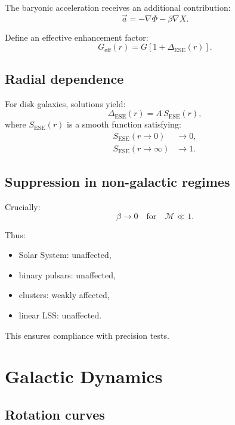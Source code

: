 \documentclass[11pt]{book}
\newcommand{\ESE}{\mathrm{ESE}}
\begin{document}
The baryonic acceleration receives an additional contribution:
\begin{equation}
\vec{a}
=
-\nabla \Phi
-
\beta \nabla X.
\end{equation}

Define an effective enhancement factor:
\begin{equation}
G_{\mathrm{eff}}(r)
=
G\left[1 + \Delta_{\ESE}(r)\right].
\end{equation}

\section{Radial dependence}

For disk galaxies, solutions yield:
\begin{equation}
\Delta_{\ESE}(r)
=
A\,S_{\ESE}(r),
\end{equation}
where $S_{\ESE}(r)$ is a smooth function satisfying:
\begin{align}
S_{\ESE}(r \to 0) &\to 0, \\
S_{\ESE}(r \to \infty) &\to 1.
\end{align}

\section{Suppression in non-galactic regimes}

Crucially:
\begin{equation}
\beta \to 0
\quad
\text{for}
\quad
\mathcal{M} \ll 1.
\end{equation}

Thus:
\begin{itemize}
\item Solar System: unaffected,
\item binary pulsars: unaffected,
\item clusters: weakly affected,
\item linear LSS: unaffected.
\end{itemize}

This ensures compliance with precision tests.

\chapter{Galactic Dynamics}

\section{Rotation curves}
\end{document}
